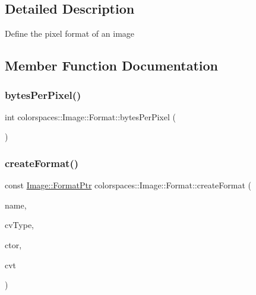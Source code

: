 \subsection{Detailed Description}
Define the pixel format of an image 

\subsection{Member Function Documentation}
\mbox{\label{classcolorspaces_1_1_image_1_1_format_a0ff066e47cb663980d8fe186994a4686}} 
\subsubsection{\texorpdfstring{bytes\+Per\+Pixel()}{bytesPerPixel()}}
{\footnotesize\ttfamily int colorspaces\+::\+Image\+::\+Format\+::bytes\+Per\+Pixel (\begin{DoxyParamCaption}{ }\end{DoxyParamCaption})\hspace{0.3cm}{\ttfamily [inline]}}

\mbox{\label{classcolorspaces_1_1_image_1_1_format_ae79208f237b72cf596331ebcec2ff58b}} 
\subsubsection{\texorpdfstring{create\+Format()}{createFormat()}}
{\footnotesize\ttfamily const \hyperlink{classcolorspaces_1_1_image_ab3978cc7acc2b5e855f8c715f09667d1}{Image\+::\+Format\+Ptr} colorspaces\+::\+Image\+::\+Format\+::create\+Format (\begin{DoxyParamCaption}\item[{const std\+::string}]{name,  }\item[{const int}]{cv\+Type,  }\item[{\hyperlink{classcolorspaces_1_1_image_a5d086f8bb03d6eab9c3accfd0040e28d}{image\+Ctor}}]{ctor,  }\item[{\hyperlink{classcolorspaces_1_1_image_a8d8b6c8b517caac4cb685f4d73e2c8dc}{image\+Cvt}}]{cvt }\end{DoxyParamCaption})\hspace{0.3cm}{\ttfamily [static]}}

